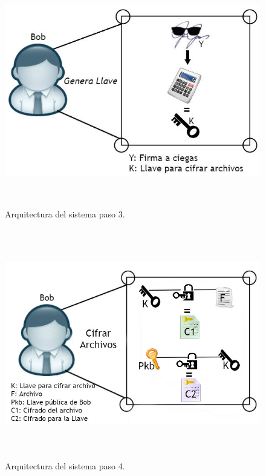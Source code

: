 \begin{figure}[H]
\centering
	\includegraphics[width=16cm, height=10cm]{./images/Paso03.jpg}
	\caption{Arquitectura del sistema paso 3.}

\end{figure}

\begin{figure}[H]
\centering
	\includegraphics[width=16cm, height=10cm]{./images/Paso04.jpg}
	\caption{Arquitectura del sistema paso 4.}

\end{figure}

